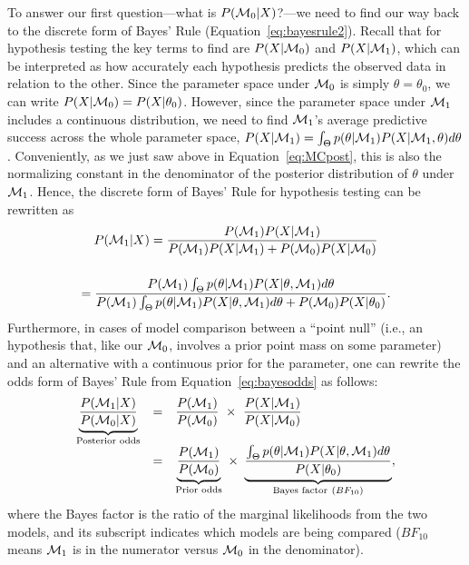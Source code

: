 To answer our first question---what is $P({\cal M}_0|X)$?---we need to find our way back to the discrete form of Bayes' Rule (Equation~\ref{eq:bayesrule2}). Recall that for hypothesis testing the key terms to find are $P(X|{\cal M}_0)$ and $P(X|{\cal M}_1)$, which can be interpreted as how accurately each hypothesis predicts the observed data in relation to the other. Since the parameter space under ${\cal M}_0$ is simply $\theta=\theta_0$, we can write $P(X|{\cal M}_0) = P(X|\theta_0)$. However, since the parameter space under ${\cal M}_1$ includes a continuous distribution, we need to find ${\cal M}_1$'s average predictive success across the whole parameter space, $P(X|{\cal M}_1)=\int_\Theta p(\theta|{\cal M}_1)P(X|{\cal M}_1,\theta)d\theta$. Conveniently, as we just saw above in Equation~\ref{eq:MCpost}, this is also the normalizing constant in the denominator of the posterior distribution of $\theta$ under ${\cal M}_1$. Hence, the discrete form of Bayes' Rule for hypothesis testing can be rewritten as
\begin{multline*}
  P({\cal M}_1|X) = \dfrac{P({\cal M}_1) P(X|{\cal M}_1)}{P({\cal M}_1)P(X|{\cal M}_1)+P({\cal M}_0)P(X|{\cal M}_0)}\\[3ex]
            = \dfrac{P({\cal M}_1) \int_\Theta p(\theta|{\cal M}_1)P(X|\theta,{\cal M}_1)d\theta}{P({\cal M}_1)
                \int_\Theta p(\theta|{\cal M}_1)P(X|\theta,{\cal M}_1)d\theta+P({\cal M}_0)P(X|\theta_0)}.
\end{multline*}
Furthermore, in cases of model comparison between a ``point null'' (i.e., an hypothesis that, like our ${\cal M}_0$, involves a prior point mass on some parameter) and an alternative with a continuous prior for the parameter, one can rewrite the odds form of Bayes' Rule from Equation~\ref{eq:bayesodds} as follows:
$$\begin{array}{rcl}
  \underbrace{\dfrac{P({\cal M}_1|X)} {P({\cal M}_0|X)}}_\text{Posterior odds} &=&
  \dfrac{P({\cal M}_1)}{P({\cal M}_0)} \ \times \
  \dfrac{P(X|{\cal M}_1)}{P(X|{\cal M}_0)}\\[3ex]
  &=&
  \underbrace{\frac{P({\cal M}_1)}{P({\cal M}_0)}}_\text{Prior odds} \ \times \
  \underbrace{\frac{\int_\Theta p(\theta|{\cal M}_1)P(X|\theta,{\cal M}_1)d\theta}{P(X|\theta_0)}}_{\text{Bayes factor} ~(BF_{10})},
\end{array}$$ where the Bayes factor is the ratio of the marginal likelihoods from the two models, and its subscript indicates which models are being compared ($BF_{10}$ means ${\cal M}_1$ is in the numerator versus ${\cal M}_0$ in the denominator).


